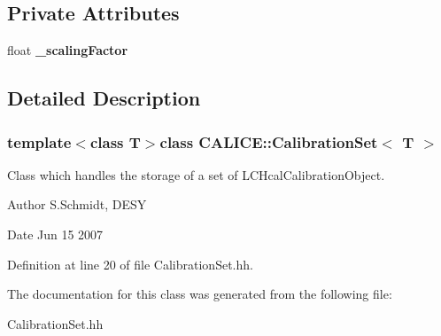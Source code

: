\subsection*{Private Attributes}
\begin{DoxyCompactItemize}
\item 
float {\bfseries \-\_\-scaling\-Factor}\label{classCALICE_1_1CalibrationSet_a6e4301d0f06d4afd7747c55cc1d72755}

\end{DoxyCompactItemize}


\subsection{Detailed Description}
\subsubsection*{template$<$class T$>$class C\-A\-L\-I\-C\-E\-::\-Calibration\-Set$<$ T $>$}

Class which handles the storage of a set of L\-C\-Hcal\-Calibration\-Object. 

\begin{DoxyAuthor}{Author}
S.\-Schmidt, D\-E\-S\-Y 
\end{DoxyAuthor}
\begin{DoxyDate}{Date}
Jun 15 2007 
\end{DoxyDate}


Definition at line 20 of file Calibration\-Set.\-hh.



The documentation for this class was generated from the following file\-:\begin{DoxyCompactItemize}
\item 
Calibration\-Set.\-hh\end{DoxyCompactItemize}

